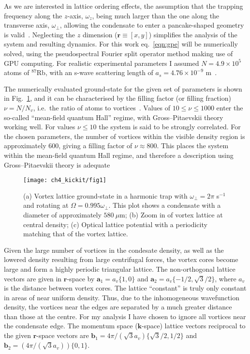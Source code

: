 As we are interested in lattice ordering effects, the assumption that the trapping frequency along the $z$-axis, $\omega_z$, being much larger than the one along the transverse axis, $\omega_\perp$, allowing the condensate to enter a pancake-shaped geometry is valid~\cite{BEC:Fetter_revmodphys_2009}. Neglecting the $z$ dimension ($\textbf{r}\equiv [x,y]$) simplifies the analysis of the system and resulting dynamics. For this work eq.~\eqref{eqn:gpe} will be numerically solved, using the pseudospectral Fourier split operator method making use of GPU computing\cite{NUMERICS}. For realistic experimental parameters I assumed  $N=4.9\times 10^5$ atoms of $^{87}$Rb, with an s-wave scattering length of $a_s=4.76\times10^{-9}$ m~\cite{AO:Roberts_prl_1998}.

The numerically evaluated ground-state for the given set of parameters is shown in Fig.~\ref{fig:vlatt_gnd}, and it can be characterised by the filling factor (or filling fraction) $\nu=N/N_v$, i.e.~the ratio of atoms to vortices~\cite{BEC:Fetter_revmodphys_2009}. Values of $10 \leq \nu \leq 1000$ enter the so-called ``mean-field quantum Hall'' regime, with Gross--Pitaevskii theory working well. For values $\nu \leq 10$ the system is said to be strongly correlated. For the chosen parameters, the number of vortices within the visible density region is approximately 600, giving a filling factor of $\nu \approx 800 $. This places the system within the mean-field quantum Hall regime, and therefore a description using Gross--Pitaevskii theory is adequate~\cite{Vtx:Schweikhard_prl_2004}

\begin{figure}[tb]
    \centering
    \texttt{[image: ch4\_kickit/fig1]}
    \caption[Comparison of vortex lattice and optical lattice structures.]{(a) Vortex lattice ground-state in a harmonic trap with $\omega_\perp=2\pi$ s$^{-1}$ and rotating at $\Omega=0.995\omega_\perp$. This plot shows a condensate with a diameter of approximately $580~\mu\textrm{m}$; (b) Zoom in of vortex lattice at central density; (c) Optical lattice potential with a periodicity matching that of the vortex lattice.}
    \label{fig:vlatt_gnd}
\end{figure}

Given the large number of vortices in the condesate density, as well as the lowered density resulting from large centrifugal forces, the vortex cores become large and form a highly periodic triangular lattice. The non-orthogonal lattice vectors are given in $\mathbf{r}$-space by $\mathbf{a}_1 = a_v\{1,0\}$ and $\mathbf{a}_2 = a_v\{-1/2, \sqrt{3}/2\}$, where $a_v$ is the distance between vortex cores. The lattice ``constant'' is truly only constant in areas of near uniform density. Thus, due to the inhomogeneous wavefunction density, the vortices near the edges are separated by a much greater distance than those at the centre. For my analysis I have chosen to ignore all vortices near the condensate edge. The momentum space ($\mathbf{k}$-space) lattice vectors reciprocal to the given $\mathbf{r}$-space vectors are $\mathbf{b}_1 = 4\pi/(\sqrt{3}a_v)\{\sqrt{3}/2,1/2\}$ and $\mathbf{b}_2 = (4\pi/(\sqrt{3}a_v))\{0,1\}$.

